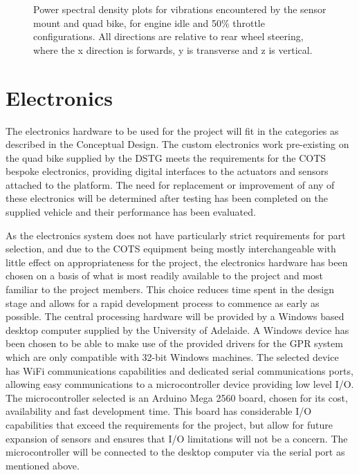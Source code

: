 \documentclass[main.tex]{subfiles}
\begin{document}
\begin{figure}[ht]
{\begin{tabular}{cc}
\end{tabular}}
\caption[Power spectral density plots for vibrations]{Power spectral density plots for vibrations encountered by the sensor mount and quad bike, for engine idle and 50\% throttle configurations. All directions are relative to rear wheel steering, where the x direction is forwards, y is transverse and z is vertical.}
\end{figure}

\section{Electronics}
The electronics hardware to be used for the project will fit in the categories as described in the Conceptual Design. The custom electronics work pre-existing on the quad bike supplied by the DSTG meets the requirements for the COTS bespoke electronics, providing digital interfaces to the actuators and sensors attached to the platform. The need for replacement or improvement of any of these electronics will be determined after testing has been completed on the supplied vehicle and their performance has been evaluated.

As the electronics system does not have particularly strict requirements for part selection, and due to the COTS equipment being mostly interchangeable with little effect on appropriateness for the project, the electronics hardware has been chosen on a basis of what is most readily available to the project and most familiar to the project members. This choice reduces time spent in the design stage and allows for a rapid development process to commence as early as possible.
%
The central processing hardware will be provided by a Windows based desktop computer supplied by the University of Adelaide. A Windows device has been chosen to be able to make use of the provided drivers for the GPR system which are only compatible with 32-bit Windows machines. The selected device has WiFi communications capabilities and dedicated serial communications ports, allowing easy communications to a microcontroller device providing low level I/O.
%
The microcontroller selected is an Arduino Mega 2560 board, chosen for its cost, availability and fast development time. This board has considerable I/O capabilities that exceed the requirements for the project, but allow for future expansion of sensors and ensures that I/O limitations will not be a concern. The microcontroller will be connected to the desktop computer via the serial port as mentioned above.
\end{document}
